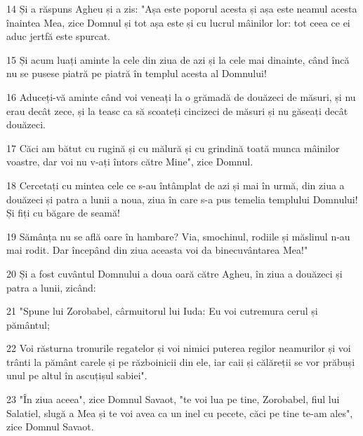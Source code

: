 \par 14 Și a răspuns Agheu și a zis: "Așa este poporul acesta și așa este neamul acesta înaintea Mea, zice Domnul și tot așa este și cu lucrul mâinilor lor: tot ceea ce ei aduc jertfă este spurcat.
\par 15 Și acum luați aminte la cele din ziua de azi și la cele mai dinainte, când încă nu se pusese piatră pe piatră în templul acesta al Domnului!
\par 16 Aduceți-vă aminte când voi veneați la o grămadă de douăzeci de măsuri, și nu erau decât zece, și la teasc ca să scoateți cincizeci de măsuri și nu găseați decât douăzeci.
\par 17 Căci am bătut cu rugină și cu mălură și cu grindină toată munca mâinilor voastre, dar voi nu v-ați întors către Mine", zice Domnul.
\par 18 Cercetați cu mintea cele ce s-au întâmplat de azi și mai în urmă, din ziua a douăzeci și patra a lunii a noua, ziua în care s-a pus temelia templului Domnului! Și fiți cu băgare de seamă!
\par 19 Sămânța nu se află oare în hambare? Via, smochinul, rodiile și măslinul n-au mai rodit. Dar începând din ziua aceasta voi da binecuvântarea Mea!"
\par 20 Și a fost cuvântul Domnului a doua oară către Agheu, în ziua a douăzeci și patra a lunii, zicând:
\par 21 "Spune lui Zorobabel, cârmuitorul lui Iuda: Eu voi cutremura cerul și pământul;
\par 22 Voi răsturna tronurile regatelor și voi nimici puterea regilor neamurilor și voi trânti la pământ carele și pe războinicii din ele, iar caii și călăreții se vor prăbuși unul pe altul în ascuțișul sabiei".
\par 23 "În ziua aceea", zice Domnul Savaot, "te voi lua pe tine, Zorobabel, fiul lui Salatiel, slugă a Mea și te voi avea ca un inel cu pecete, căci pe tine te-am ales", zice Domnul Savaot.



